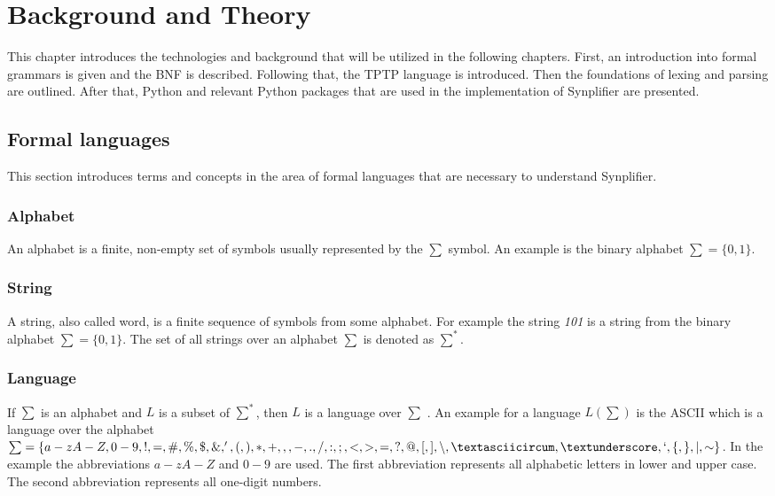 
\chapter{Background and Theory}\label{cha:Background}

This chapter introduces the technologies and background that will be utilized in the following chapters. First, an introduction into formal grammars is given and the \acf{BNF} is described. Following that, the \ac{TPTP} language is introduced. Then the foundations of lexing and parsing are outlined. After that, Python and relevant Python packages that are used in the implementation of \ac{Synplifier} are presented.

\section{Formal languages}\label{sec:BackgroundFormalLanguage}

This section introduces terms and concepts in the area of formal languages that are necessary to understand \ac{Synplifier}.

\subsection{Alphabet}
An alphabet is a finite, non-empty set of symbols usually represented by the $\sum$ symbol.
An example is the binary alphabet $\sum = \{0,1\}$. \cite{AutomataTheory.2007}

\subsection{String}
A string, also called word, is a finite sequence of symbols from some alphabet. For example the string \textit{101} is a string from the binary alphabet $\sum = \{0,1\}$.
The set of all strings over an alphabet $\sum$ is denoted as $\sum ^{*}$. \cite{AutomataTheory.2007}

\subsection{Language}
If $\sum$ is an alphabet and $L$ is a subset of $\sum ^*$, then $L$ is a language over $\sum$ \cite{AutomataTheory.2007}.
An example for a language $L(\sum)$ is the \ac{ASCII} which is a language over the alphabet $\sum = \{a-zA-Z,0-9,!,=,\#,\%,\$,\&,',(,),*,+,,,-,.,/,:,;,<,>,=,?,@,[,],\backslash ,\textasciicircum ,\textunderscore ,`,\{,\},\mid,\sim\}$. In the example the abbreviations $a-zA-Z$ and $0-9$ are used. The first abbreviation represents all alphabetic letters in lower and upper case. The second abbreviation represents all one-digit numbers.

